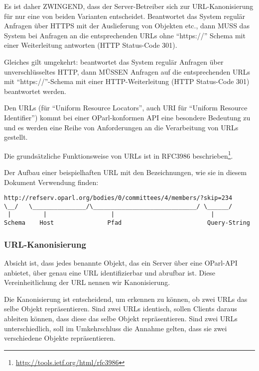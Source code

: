 \documentclass[,a4paper]{article}
\begin{document}
Es ist daher ZWINGEND, dass der Server-Betreiber sich zur
URL-Kanonisierung für nur eine von beiden Varianten entscheidet.
Beantwortet das System regulär Anfragen über HTTPS mit der Auslieferung
von Objekten etc., dann MUSS das System bei Anfragen an die
entsprechenden URLs ohne ``https://'' Schema mit einer Weiterleitung
antworten (HTTP Status-Code 301).

Gleiches gilt umgekehrt: beantwortet das System regulär Anfragen über
unverschlüsseltes HTTP, dann MÜSSEN Anfragen auf die entsprechenden URLs
mit ``https://''-Schema mit einer HTTP-Weiterleitung (HTTP Status-Code
301) beantwortet werden.


Den URLs (für ``Uniform Resource Locators'', auch URI für ``Uniform
Resource Identifier'') kommt bei einer OParl-konformen API eine
besondere Bedeutung zu und es werden eine Reihe von Anforderungen an die
Verarbeitung von URLs gestellt.

Die grundsätzliche Funktionsweise von URLs ist in RFC3986
beschrieben\footnote{\url{http://tools.ietf.org/html/rfc3986}}.

Der Aufbau einer beispielhaften URL mit den Bezeichnungen, wie sie in
diesem Dokument Verwendung finden:

\begin{verbatim}
http://refserv.oparl.org/bodies/0/committees/4/members/?skip=234
\__/   \_______________/\_____________________________/ \______/
 |         |                  |                           |
Schema    Host               Pfad                        Query-String
\end{verbatim}

\subsubsection{URL-Kanonisierung}\label{url-kanonisierung}

Absicht ist, dass jedes benannte Objekt, das ein Server über eine
OParl-API anbietet, über genau eine URL identifizierbar und abrufbar
ist. Diese Vereinheitlichung der URL nennen wir Kanonisierung.

Die Kanonisierung ist entscheidend, um erkennen zu können, ob zwei URLs
das selbe Objekt repräsentieren. Sind zwei URLs identisch, sollen
Clients daraus ableiten können, dass diese das selbe Objekt
repräsentieren. Sind zwei URLs unterschiedlich, soll im Umkehrschluss
die Annahme gelten, dass sie zwei verschiedene Objekte repräsentieren.
\end{document}
